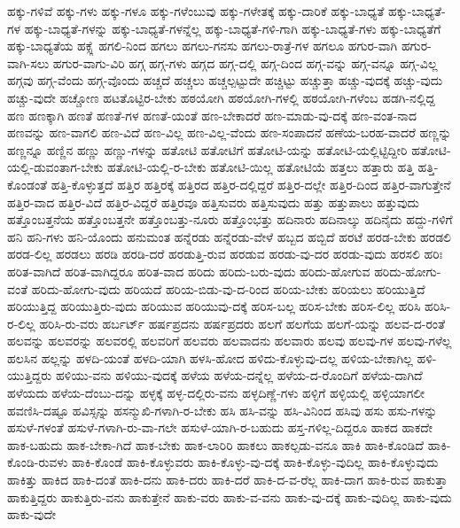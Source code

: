 {ಹಕ್ಕು-ಗಳಿವೆ
ಹಕ್ಕು-ಗಳು
ಹಕ್ಕು-ಗಳೂ
ಹಕ್ಕು-ಗಳೆಂಬುವು
ಹಕ್ಕು-ಗಳೇತಕ್ಕೆ
ಹಕ್ಕು-ದಾರಿಕೆ
ಹಕ್ಕು-ಬಾಧ್ಯತೆ
ಹಕ್ಕು-ಬಾಧ್ಯತೆ-ಗಳ
ಹಕ್ಕು-ಬಾಧ್ಯತೆ-ಗಳನ್ನು
ಹಕ್ಕು-ಬಾಧ್ಯತೆ-ಗಳನ್ನೆಲ್ಲ
ಹಕ್ಕು-ಬಾಧ್ಯತೆ-ಗಳಿ-ಗಾಗಿ
ಹಕ್ಕು-ಬಾಧ್ಯತೆ-ಗಳು
ಹಕ್ಕು-ಬಾಧ್ಯತೆಗೆ
ಹಕ್ಕು-ಬಾಧ್ಯತೆಯ
ಹಕ್ಸ್ಲೆ
ಹಗಲಿ-ನಿಂದ
ಹಗಲು
ಹಗಲು-ಗನಸು
ಹಗಲು-ರಾತ್ರೆ-ಗಳ
ಹಗಲೂ
ಹಗುರ-ವಾಗಿ
ಹಗುರ-ವಾಗಿ-ಸಲು
ಹಗುರ-ವಾಗು-ವಿರಿ
ಹಗ್ಗ
ಹಗ್ಗ-ಗಳು
ಹಗ್ಗದ
ಹಗ್ಗ-ದಲ್ಲಿ
ಹಗ್ಗ-ದಿಂದ
ಹಗ್ಗ-ವನ್ನು
ಹಗ್ಗ-ವನ್ನೂ
ಹಗ್ಗ-ವಿಲ್ಲ
ಹಗ್ಗವು
ಹಗ್ಗ-ವೆಂದು
ಹಗ್ಗ-ವೊಂದು
ಹಚ್ಚದೆ
ಹಚ್ಚಲು
ಹಚ್ಚಲ್ಪಟ್ಟುದೇ
ಹಚ್ಚಿಟ್ಟು
ಹಚ್ಚುತ್ತಾ
ಹಚ್ಚು-ವುದಕ್ಕೆ
ಹಚ್ಚು-ವುದು
ಹಚ್ಚು-ವುದೇ
ಹಚ್ಚೋಣ
ಹಟತೊಟ್ಟಿರ-ಬೇಕು
ಹಠಯೋಗಿ
ಹಠಯೋಗಿ-ಗಳಲ್ಲಿ
ಹಠಯೋಗಿ-ಗಳೆಂಬ
ಹಡಗಿ-ನಲ್ಲಿದ್ದ
ಹಣ
ಹಣಕ್ಕಾಗಿ
ಹಣತೆ
ಹಣತೆ-ಗಳ
ಹಣತೆ-ಯಂತೆ
ಹಣ-ಬೇಕಾದರೆ
ಹಣ-ಮಾಡು-ವು-ದಕ್ಕೆ
ಹಣ-ವಂತ-ನಾದ
ಹಣವನ್ನು
ಹಣ-ವಾಗಲಿ
ಹಣ-ವಿದೆ
ಹಣ-ವಿಲ್ಲ
ಹಣ-ವಿಲ್ಲ-ವೆಂದು
ಹಣ-ಸಂಪಾದನೆ
ಹಣೆಯ-ಬರಹ-ವಾದರೆ
ಹಣ್ಣನ್ನು
ಹಣ್ಣನ್ನೂ
ಹಣ್ಣಿನ
ಹಣ್ಣು
ಹಣ್ಣು-ಗಳನ್ನು
ಹತೋಟಿ
ಹತೋಟಿಗೆ
ಹತೋಟಿ-ಯನ್ನು
ಹತೋಟಿ-ಯಲ್ಲಿಟ್ಟಿದ್ದೀರಿ
ಹತೋಟಿ-ಯಲ್ಲಿ-ಡುವಂತಾಗ-ಬೇಕು
ಹತೋಟಿ-ಯಲ್ಲಿ-ರ-ಬೇಕು
ಹತೋಟಿ-ಯಿಲ್ಲ
ಹತೋಟಿಯೆ
ಹತ್ತಲು
ಹತ್ತಾರು
ಹತ್ತಿ
ಹತ್ತಿ-ಕೊಂಡಂತೆ
ಹತ್ತಿ-ಕೊಳ್ಳುತ್ತದೆ
ಹತ್ತಿರ
ಹತ್ತಿರಕ್ಕೆ
ಹತ್ತಿರದ
ಹತ್ತಿರ-ದಲ್ಲಿದ್ದರೆ
ಹತ್ತಿರ-ದಲ್ಲೇ
ಹತ್ತಿರ-ದಿಂದ
ಹತ್ತಿರ-ವಾಗುತ್ತೇನೆ
ಹತ್ತಿರ-ವಾದ
ಹತ್ತಿರ-ವಿದೆ
ಹತ್ತಿರ-ವಿದ್ದರೆ
ಹತ್ತಿರವೂ
ಹತ್ತಿಸುವರು
ಹತ್ತಿಸುವುದು
ಹತ್ತು
ಹತ್ತುಪಾಲು
ಹತ್ತುವುದು
ಹತ್ತೊಂಬತ್ತನೆಯ
ಹತ್ತೊಂಬತ್ತನೇ
ಹತ್ತೊಂಬತ್ತು-ನೂರು
ಹತ್ತೊಂಭತ್ತು
ಹದಿನಾರು
ಹದಿನಾಲ್ಕು
ಹದಿನೈದು
ಹದ್ದು-ಗಳಿಗೆ
ಹನಿ
ಹನಿ-ಗಳು
ಹನಿ-ಯೊಂದು
ಹನುಮಂತ
ಹನ್ನೆರಡು
ಹನ್ನೆರಡು-ವೇಳೆ
ಹಬ್ಬದ
ಹಬ್ಬಿದೆ
ಹರಟೆ
ಹರಡ-ಬೇಕು
ಹರಡಲಿ
ಹರಡ-ಲಿಲ್ಲ
ಹರಡಲು
ಹರಡಿ
ಹರಡಿ-ದರೆ
ಹರಡುತ್ತಿ-ರುವ
ಹರಡುವ
ಹರಡು-ವು-ದರ
ಹರಡು-ವುದು
ಹರಸಲಿ
ಹರಿಃ
ಹರಿತ-ವಾಗಿದೆ
ಹರಿತ-ವಾಗಿದ್ದರೂ
ಹರಿತ-ವಾದ
ಹರಿದು
ಹರಿದು-ಬರು-ವುದು
ಹರಿದು-ಹೋಗುವ
ಹರಿದು-ಹೋಗು-ವಂತೆ
ಹರಿದು-ಹೋಗು-ವುದು
ಹರಿಯದೆ
ಹರಿಯ-ಬಿಡು-ವು-ದ-ರಿಂದ
ಹರಿಯ-ಬೇಕು
ಹರಿಯಲು
ಹರಿಯುತ್ತಿದೆ
ಹರಿಯುತ್ತಿದ್ದ
ಹರಿಯುತ್ತಿರು-ವುದು
ಹರಿಯುವ
ಹರಿಯುವು-ದಕ್ಕೆ
ಹರಿಸ-ಬಲ್ಲ
ಹರಿಸ-ಬೇಕು
ಹರಿಸ-ಲಿಲ್ಲ
ಹರಿಸಿ
ಹರಿಸಿ-ರ-ಲಿಲ್ಲ
ಹರಿಸಿ-ರು-ವರು
ಹರ್ಬರ್ಟ್
ಹರ್ಷಪ್ರದನು
ಹರ್ಷಪ್ರದರು
ಹಲಗೆ
ಹಲಗೆಯ
ಹಲಗೆ-ಯನ್ನು
ಹಲವ-ದ-ರಂತೆ
ಹಲವನ್ನು
ಹಲವರನ್ನು
ಹಲವರಲ್ಲಿ
ಹಲವರಿಗೆ
ಹಲವರು
ಹಲವಾದನು
ಹಲವಾರು
ಹಲವು
ಹಲವು-ಗಳ
ಹಲವು-ಗಳೆಲ್ಲ
ಹಲಸಿನ
ಹಲ್ಲನ್ನು
ಹಳದಿ-ಯಂತೆ
ಹಳದಿ-ಯಾಗಿ
ಹಳಸಿ-ಹೋದ
ಹಳಿದು-ಕೊಳ್ಳುವು-ದಲ್ಲ
ಹಳಿಯ-ಬೇಕಾಗಿಲ್ಲ
ಹಳಿ-ಯುತ್ತಿದ್ದರು
ಹಳಿಯು-ವನು
ಹಳಿಯು-ವುದಕ್ಕೆ
ಹಳೆಯ
ಹಳೆಯ-ದನ್ನೆಲ್ಲ
ಹಳೆಯ-ದ-ರೊಂದಿಗೆ
ಹಳೆಯ-ದಾಗಿದೆ
ಹಳೆಯದು
ಹಳೆಯ-ದೆಂಬು-ದನ್ನು
ಹಳ್ಳಕ್ಕೆ
ಹಳ್ಳ-ದಲ್ಲಿರು-ವನು
ಹಳ್ಳದಿಣ್ಣೆ-ಗಳು
ಹಳ್ಳಿಗೆ
ಹಳ್ಳಿಯಲ್ಲಿ
ಹಳ್ಳಿಯಾಗಲೀ
ಹವಣಿಸಿ-ದಷ್ಟೂ
ಹವಿಸ್ಸನ್ನು
ಹಸನ್ಮುಖಿ-ಗಳಾಗಿ-ರ-ಬೇಕು
ಹಸಿ
ಹಸಿ-ವನ್ನು
ಹಸಿ-ವಿನಿಂದ
ಹಸಿವು
ಹಸು
ಹಸು-ಗಳನ್ನು
ಹಸುಳೆ-ಗಳಂತೆ
ಹಸುಳೆ-ಗಳಾಗಿ-ರು-ವಾ-ಗಲೇ
ಹಸುಳೆ-ಯಾಗಿ-ರ-ಬಹುದು
ಹಸ್ತ-ಗಳಿಲ್ಲ-ದಿದ್ದರೂ
ಹಾಕದ
ಹಾಕದೇ
ಹಾಕ-ಬಹುದು
ಹಾಕ-ಬೇಕಾ-ಗಿದೆ
ಹಾಕ-ಬೇಕು
ಹಾಕ-ಲಾರಿರಿ
ಹಾಕಲು
ಹಾಕಲ್ಪಡು-ವನೂ
ಹಾಕಿ
ಹಾಕಿ-ಕೊಂಡಿದೆ
ಹಾಕಿ-ಕೊಂಡಿ-ರುವಳು
ಹಾಕಿ-ಕೊಂಡೆ
ಹಾಕಿ-ಕೊಳ್ಳುವರು
ಹಾಕಿ-ಕೊಳ್ಳು-ವು-ದಕ್ಕೆ
ಹಾಕಿ-ಕೊಳ್ಳು-ವುದಿಲ್ಲ
ಹಾಕಿ-ಕೊಳ್ಳುವುದು
ಹಾಕಿತ್ತು
ಹಾಕಿದ
ಹಾಕಿ-ದಂತೆ
ಹಾಕಿ-ದನು
ಹಾಕಿ-ದರು
ಹಾಕಿ-ದರೆ
ಹಾಕಿ-ದ-ವ-ರೆಲ್ಲ
ಹಾಕಿ-ದಾಗ
ಹಾಕಿ-ರುವ
ಹಾಕುತ್ತಾ
ಹಾಕುತ್ತಿದ್ದರು
ಹಾಕುತ್ತಿರು-ವನು
ಹಾಕುತ್ತೇನೆ
ಹಾಕು-ವರು
ಹಾಕು-ವ-ವನು
ಹಾಕು-ವು-ದಕ್ಕೆ
ಹಾಕು-ವುದಿಲ್ಲ
ಹಾಕು-ವುದು
ಹಾಕು-ವುದೇ
}
